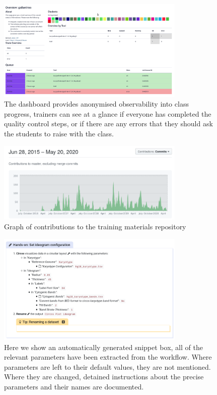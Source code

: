 \documentclass[10pt,letterpaper]{article}
\begin{document}
\begin{figure}[!ht]
	\centering
	\includegraphics[width=0.8\textwidth]{images/tiaas.png}
	\caption{The dashboard provides anonymised observability into class progress, trainers can see at a glance if everyone has completed the quality control steps, or if there are any errors that they should ask the students to raise with the class.\label{fig:tiaas}}
\end{figure}

\begin{figure}[!ht]
	\centering
	\includegraphics[width=0.8\textwidth]{images/commits.png}
	\caption{Graph of contributions to the training materials repository\label{fig:contributions}}
\end{figure}

\begin{figure}[!ht]
	\centering
	\includegraphics[width=0.8\textwidth]{images/tool-in-tutorial.png}
	\caption{Here we show an automatically generated snippet box, all of the relevant parameters have been extracted from the workflow. Where parameters are left to their default values, they are not mentioned. Where they are changed, detained instructions about the precise parameters and their names are documented.\label{fig:planemo}}
\end{figure}
\end{document}
